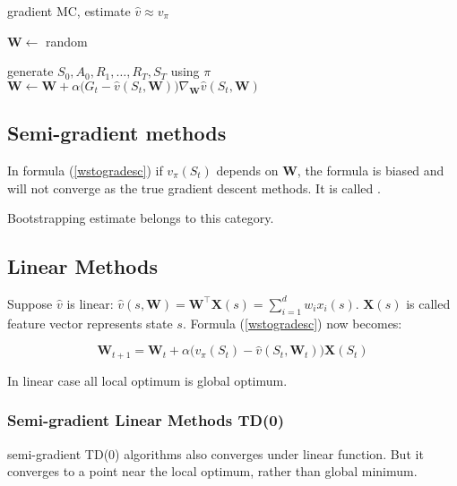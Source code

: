 \begin{algorithm}
	\caption{gradient MC, estimate $\widehat{v} \approx v_\pi$ }\label{algo:gradmcapprox}	
	
	\begin{algorithmic}[1]
		\State $\mathbf{W} \gets $ random
		
		\Statex
		
		\Loop
			\State generate $S_0,A_0,R_1,\dots,R_T,S_T$ using $\pi$
				\State $\mathbf{W} \gets \mathbf{W} + \alpha \Big( G_t - \widehat{v}(S_t, \mathbf{W}) \Big) \nabla_{\mathbf{W}} \widehat{v}(S_t, \mathbf{W})$
			\EndFor
		\EndLoop
	\end{algorithmic}
\end{algorithm}
 
 \subsection{Semi-gradient methods}
 
 In formula (\ref{wstogradesc}) if $v_\pi(S_t)$ depends on $\mathbf{W}$, the formula is biased and will not converge as the true gradient descent methods. It is called .
 
 Bootstrapping estimate belongs to this category.
 
 
\subsection{Linear Methods}

Suppose $\widehat{v}$ is linear: $\widehat{v}(s,\mathbf{W})= \mathbf{W}^\top \mathbf{X}(s) = \sum\limits_{i=1}^d w_i x_i(s)$. $\mathbf{X}(s)$ is called feature vector represents state $s$.  Formula (\ref{wstogradesc}) now becomes:

\begin{equation}\label{lineargraddesc}
	\mathbf{W}_{t+1} = \mathbf{W}_t+ \alpha \Big ( v_\pi(S_t) - \widehat{v}(S_t, \mathbf{W}_t) \Big ) \mathbf{X}(S_t)
\end{equation}

In linear case all local optimum is global optimum. 

\subsubsection{Semi-gradient Linear Methods TD(0)}

semi-gradient TD(0) algorithms also converges under linear function. But it converges to a point near the local optimum, rather than global minimum.

